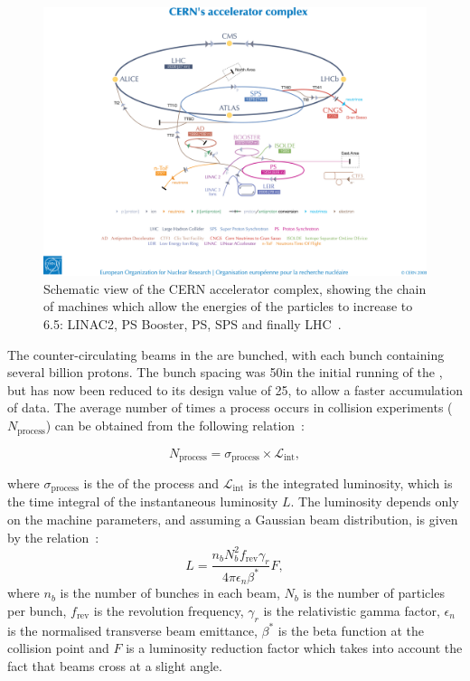 \begin{figure}[h]
\centering
\includegraphics[width=1.0\textwidth]{detectorFigures/accelerators.jpg}
\caption[Schematic view of the CERN accelerator complex, showing the chain of machines which allow the energies of the particles to increase to 6.5\TeV: LINAC2, PS Booster, PS, SPS and finally LHC\quad\cite{Christiane:1260465}.]{Schematic view of the CERN accelerator complex, showing the chain of machines which allow the energies of the particles to increase to 6.5\TeV: LINAC2, PS Booster, PS, SPS and finally LHC~\cite{Christiane:1260465}.}
\label{fig:accelerators}
\end{figure}

The counter-circulating beams in the \LHC are bunched, with each bunch containing several billion protons. The bunch spacing was 50\ns in the initial running of the \LHC, but has now been reduced to its design value of 25\ns, to allow a faster accumulation of data. The average number of times a process occurs in collision experiments ($N_{\text{process}}$) can be obtained from the following relation~\cite{Benedikt:823808}:

\begin{equation}
\label{eq:NeqSigmaL}
N_{\text{process}} = \sigma_{\text{process}}\times \mathcal{L}_{\text{int}},
\end{equation}

where $\sigma_{\text{process}}$ is the \crosssection of the process and $\mathcal{L}_{\text{int}}$ is the integrated luminosity, which is the time integral of the instantaneous luminosity $L$. The luminosity depends only on the machine parameters, and assuming a Gaussian beam distribution, is given by the relation~\cite{Benedikt:823808}:
\begin{equation}
\label{eq:NeqSigmaL}
L = \frac{n_{b} N^{2}_{b} f_{\text{rev}} \gamma_{r}}{4 \pi \epsilon_{n} \beta^{*}} F,
\end{equation}
where $n_{b}$ is the number of bunches in each beam, $N_{b}$ is the number of particles per bunch, $f_{\text{rev}}$ is the revolution frequency, $\gamma_{r}$ is the relativistic gamma factor, $\epsilon_{n}$ is the normalised transverse beam emittance, $\beta^{*}$ is the beta function at the collision point and $F$ is a luminosity reduction factor which takes into account the fact that beams cross at a slight angle. 

